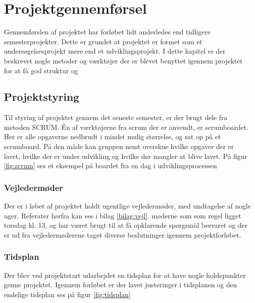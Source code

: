 \thispagestyle{fancy}
\chapter{Projektgennemførsel}
\label{chp:projektgennemforsel}

Gennemførslen af projektet har forløbet lidt anderledes end tidligere semesterprojekter. Dette er grundet at projektet er formet som et undersøgelsesprojekt mere end et udviklingsprojekt. I dette kapitel er der beskrevet nogle metoder og værktøjer der er blevet benyttet igennem projektet for at få god struktur og

\section{Projektstyring}
\label{sec:projektstyring}

Til styring af projektet gennem det seneste semester, er der brugt dele fra metoden SCRUM.
Én af værktøjerne fra scrum der er anvendt, er scrumboardet. Her er alle opgaverne nedbrudt i mindst mulig størrelse, og sat op på et scrumboard. På den måde kan gruppen nemt overskue hvilke opgaver der er lavet, hvilke der er under udvikling og hvilke der mangler at blive lavet. På figur \ref{fig:scrum} ses et eksempel på boardet fra en dag i udviklingsprocessen


\subsection{Vejledermøder}
Der er i løbet af projektet holdt ugentlige vejledermøder, med undtagelse af nogle uger. Referater herfra kan ses i bilag \ref{bilag:vejl}.  møderne som som regel ligget torsdag kl. 13, og har været brugt til at få opklarende spørgsmål besvaret og der er ud fra vejledermøderene taget diverse beslutninger igennem projektforløbet.

\subsection{Tidsplan}
\label{sec:tidsplan}
Der blev ved projektstart udarbejdet en tidsplan for at have nogle holdepunkter genne projektet. Igennem forløbet er der lavet justeringer i tidsplanen og den endelige tidsplan ses på figur \ref{fig:tidsplan}


